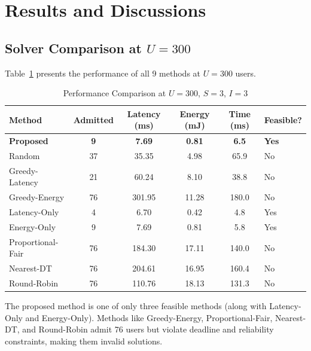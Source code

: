 \documentclass[12pt]{article}
\begin{document}
\newpage

\section{Results and Discussions}

\subsection{Solver Comparison at $U = 300$}

Table~\ref{tab:results} presents the performance of all 9 methods at $U = 300$ users.

\begin{table}[H]
\centering
\caption{Performance Comparison at $U = 300$, $S = 3$, $I = 3$}
\label{tab:results}
\begin{tabular}{lccccl}
\toprule
\textbf{Method} & \textbf{Admitted} & \textbf{Latency (ms)} & \textbf{Energy (mJ)} & \textbf{Time (ms)} & \textbf{Feasible?} \\
\midrule
\textbf{Proposed}  & \textbf{9}  & \textbf{7.69}  & \textbf{0.81}  & \textbf{6.5}   & \textbf{Yes} \\
Random             & 37          & 35.35          & 4.98           & 65.9           & No \\
Greedy-Latency     & 21          & 60.24          & 8.10           & 38.8           & No \\
Greedy-Energy      & 76          & 301.95         & 11.28          & 180.0          & No \\
Latency-Only       & 4           & 6.70           & 0.42           & 4.8            & Yes \\
Energy-Only        & 9           & 7.69           & 0.81           & 5.8            & Yes \\
Proportional-Fair  & 76          & 184.30         & 17.11          & 140.0          & No \\
Nearest-DT         & 76          & 204.61         & 16.95          & 160.4          & No \\
Round-Robin        & 76          & 110.76         & 18.13          & 131.3          & No \\
\bottomrule
\end{tabular}
\end{table}

The proposed method is one of only three feasible methods (along with Latency-Only and Energy-Only). Methods like Greedy-Energy, Proportional-Fair, Nearest-DT, and Round-Robin admit 76 users but violate deadline and reliability constraints, making them invalid solutions.
\end{document}
